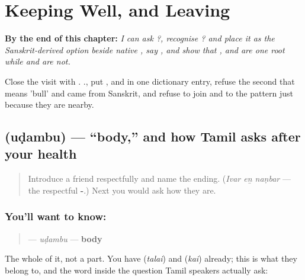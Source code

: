 
\chapter{Keeping Well, and Leaving}
\label{ch:ta-keeping-well-and-leaving}

\begin{chapteropening}
\textbf{By the end of this chapter:} \emph{I can ask    ?, recognise ? and place it as the Sanskrit-derived option beside native , say  , and show that ,  and  are one root while  and  are not.}

Close the visit with .  ., put ,  and  in one dictionary entry, refuse the second  that means 'bull' and came from Sanskrit, and refuse to join  and  to the pattern just because they are nearby.
\end{chapteropening}

\section[\texorpdfstring{\ta{உடம்பு} (uḍambu)}{உடம்பு (uḍambu)}]{ (uḍambu) — \textquotedblleft{}body,\textquotedblright{} and how Tamil asks after your health}

\label{lesson:TA-C38-udambu}



\begin{quote}
Introduce a friend respectfully and name the ending. (\emph{Ivar eṉ naṇbar} — the respectful \textbf{-}.) Next you would ask how they are.
\end{quote}

\subsection*{You'll want to know: }
\begin{quote}
\textbf{} — \emph{uḍambu} — \textbf{body}
\end{quote}

The whole of it, not a part. You have \textbf{} (\emph{talai}) and \textbf{} (\emph{kai}) already; this is what they belong to, and the word inside the question Tamil speakers actually ask:

